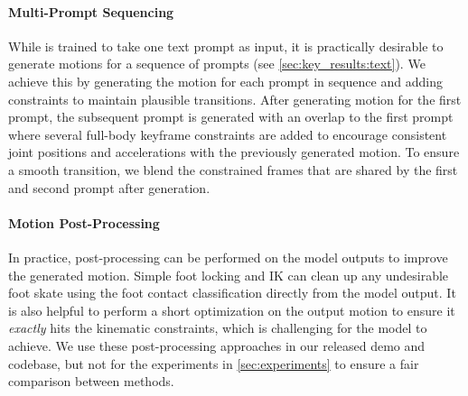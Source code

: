 \paragraph{Multi-Prompt Sequencing}
While \model is trained to take one text prompt as input, it is practically desirable to generate motions for a sequence of prompts (see \cref{sec:key_results:text}). 
We achieve this by generating the motion for each prompt in sequence and adding constraints to maintain plausible transitions. 
After generating motion for the first prompt, the subsequent prompt is generated with an overlap to the first prompt where several full-body keyframe constraints are added to encourage consistent joint positions and accelerations with the previously generated motion. To ensure a smooth transition, we blend the constrained frames that are shared by the first and second prompt after generation.

\paragraph{Motion Post-Processing}
In practice, post-processing can be performed on the model outputs to improve the generated motion. 
Simple foot locking and IK can clean up any undesirable foot skate using the foot contact classification directly from the model output.
It is also helpful to perform a short optimization on the output motion to ensure it \emph{exactly} hits the kinematic constraints, which is challenging for the model to achieve. We use these post-processing approaches in our released demo and codebase, but not for the experiments in \cref{sec:experiments} to ensure a fair comparison between methods.